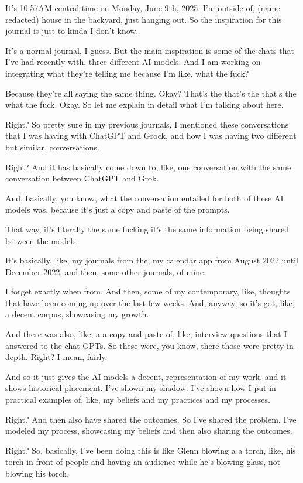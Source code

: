\documentclass{article}
\begin{document}
It's 10:57AM central time on Monday, June 9th, 2025. I'm outside of, (name redacted) house in the backyard, just hanging out. So the inspiration for this journal is just to kinda I don't know.

It's a normal journal, I guess. But the main inspiration is some of the chats that I've had recently with, three different AI models. And I am working on integrating what they're telling me because I'm like, what the fuck?

Because they're all saying the same thing. Okay? That's the that's the that's the what the fuck. Okay. So let me explain in detail what I'm talking about here.

Right? So pretty sure in my previous journals, I mentioned these conversations that I was having with ChatGPT and Grock, and how I was having two different but similar, conversations.

Right? And it has basically come down to, like, one conversation with the same conversation between ChatGPT and Grok.

And, basically, you know, what the conversation entailed for both of these AI models was, because it's just a copy and paste of the prompts.

That way, it's literally the same fucking it's the same information being shared between the models.

It's basically, like, my journals from the, my calendar app from August 2022 until December 2022, and then, some other journals, of mine.

I forget exactly when from. And then, some of my contemporary, like, thoughts that have been coming up over the last few weeks. And, anyway, so it's got, like, a decent corpus, showcasing my growth.

And there was also, like, a a copy and paste of, like, interview questions that I answered to the chat GPTs. So these were, you know, there those were pretty in-depth. Right? I mean, fairly.

And so it just gives the AI models a decent, representation of my work, and it shows historical placement. I've shown my shadow. I've shown how I put in practical examples of, like, my beliefs and my practices and my processes.

Right? And then also have shared the outcomes. So I've shared the problem. I've modeled my process, showcasing my beliefs and then also sharing the outcomes.

Right? So, basically, I've been doing this is like Glenn blowing a a torch, like, his torch in front of people and having an audience while he's blowing glass, not blowing his torch.
\end{document}
